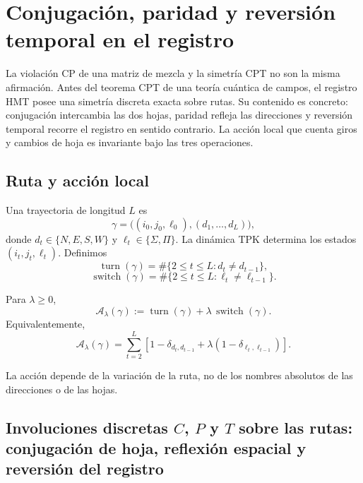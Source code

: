 \chapter{Conjugación, paridad y reversión temporal en el registro}
\label{chap:cpt-discreto-rutas-rev6}

La violación CP de una matriz de mezcla y la simetría CPT no son la misma
afirmación. Antes del teorema CPT de una teoría cuántica de campos, el
registro
HMT posee una simetría discreta exacta sobre rutas. Su contenido es concreto:
conjugación intercambia las dos hojas, paridad refleja las direcciones y
reversión temporal recorre el registro en sentido contrario. La acción local
que cuenta giros y cambios de hoja es invariante bajo las tres operaciones.

\section{Ruta y acción local}

Una trayectoria de longitud \(L\) es
\[
 \gamma=
 \bigl((i_0,j_0,\ell_0),(d_1,\ldots,d_L)\bigr),
\]
donde \(d_t\in\{N,E,S,W\}\) y
\(\ell_t\in\{\Sigma,\Pi\}\). La dinámica TPK determina los estados
\((i_t,j_t,\ell_t)\). Definimos
\[
 \operatorname{turn}(\gamma)
 =
 \#\{2\leq t\leq L:d_t\neq d_{t-1}\},
\]
\[
 \operatorname{switch}(\gamma)
 =
 \#\{2\leq t\leq L:\ell_t\neq\ell_{t-1}\}.
\]

\begin{definition}
\label{def:accion-minima-cpt-rev6}
Para \(\lambda\geq0\),
\[
 \mathcal A_\lambda(\gamma)
 :=
 \operatorname{turn}(\gamma)
 +\lambda\,\operatorname{switch}(\gamma).
\]
Equivalentemente,
\[
 \mathcal A_\lambda(\gamma)
 =
 \sum_{t=2}^{L}
 \left[
 1-\delta_{d_t,d_{t-1}}
 +\lambda(1-\delta_{\ell_t,\ell_{t-1}})
 \right].
\]
\end{definition}

La acción depende de la variación de la ruta, no de los nombres absolutos de
las direcciones o de las hojas.

\section{Involuciones discretas \(C\), \(P\) y \(T\) sobre las rutas: conjugación de hoja, reflexión espacial y reversión del registro}

